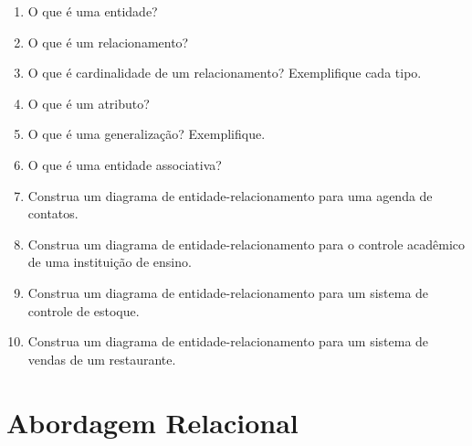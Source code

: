 \documentclass[11pt]{article}
\begin{document}
\begin{enumerate}

\item O que é uma entidade?

\item O que é um relacionamento?

\item O que é cardinalidade de um relacionamento? Exemplifique cada tipo.

\item O que é um atributo?

\item O que é uma generalização? Exemplifique.

\item O que é uma entidade associativa?

\item Construa um diagrama de entidade-relacionamento para uma agenda de contatos.

\item Construa um diagrama de entidade-relacionamento para o controle acadêmico de uma
instituição de ensino.

\item Construa um diagrama de entidade-relacionamento para um sistema de controle de estoque.

\item Construa um diagrama de entidade-relacionamento para um sistema de vendas de um
restaurante. 

\end{enumerate}

\newpage

\section{Abordagem Relacional}
\end{document}

